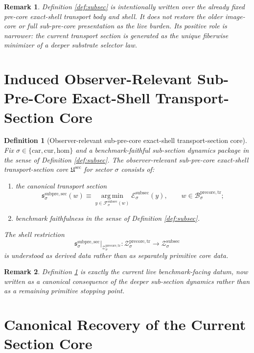 \documentclass[11pt]{article}
\newcommand{\Car}{\mathrm{car}}
\newcommand{\Cur}{\mathrm{cur}}
\newcommand{\Hom}{\mathrm{hom}}
\newcommand{\PreCoreTrBody}[1]{\mathcal B_{#1}^{\mathrm{precore,tr}}}
\newcommand{\PreCoreTrShell}[1]{\mathcal Z_{#1}^{\mathrm{precore,tr}}}
\newcommand{\SubPreSectionCore}{\mathfrak U^{\mathrm{sec}}}
\newcommand{\SubPreSection}[1]{\mathfrak s_{#1}^{\mathrm{subpre,sec}}}
\newcommand{\SubSectionFunctional}[1]{\mathscr E_{#1}^{\mathrm{subsec}}}
\newcommand{\SubSectionFiber}[2]{\mathcal F_{#1}^{\mathrm{subsec}}(#2)}
\newcommand{\SubSectionShell}[1]{\mathcal Z_{#1}^{\mathrm{subsec}}}
\newtheorem{definition}{Definition}
\newtheorem{remark}{Remark}
\begin{document}
\begin{remark}
Definition \ref{def:subsec} is intentionally written over the already fixed pre-core exact-shell transport body and shell. It does not restore the older image-core or full sub-pre-core presentation as the live burden. Its positive role is narrower: the current transport section is generated as the unique fiberwise minimizer of a deeper substrate selector law.
\end{remark}

\section{Induced Observer-Relevant Sub-Pre-Core Exact-Shell Transport-Section Core}

\begin{definition}[Observer-relevant sub-pre-core exact-shell transport-section core]
\label{def:sectioncore}
Fix \(\sigma\in\{\Car,\Cur,\Hom\}\) and a benchmark-faithful sub-section dynamics package in the sense of Definition \ref{def:subsec}. The \emph{observer-relevant sub-pre-core exact-shell transport-section core} \(\SubPreSectionCore\) for sector \(\sigma\) consists of:
\begin{enumerate}
    \item the canonical transport section
    \[
    \SubPreSection{\sigma}(w)
    \equiv
    \operatorname*{arg\,min}_{y\in\SubSectionFiber{\sigma}{w}}
    \SubSectionFunctional{\sigma}(y),
    \qquad
    w\in\PreCoreTrBody{\sigma};
    \]
    \item benchmark faithfulness in the sense of Definition \ref{def:subsec}.
\end{enumerate}
The shell restriction
\[
\SubPreSection{\sigma}\big|_{\PreCoreTrShell{\sigma}}
:
\PreCoreTrShell{\sigma}\to\SubSectionShell{\sigma}
\]
is understood as derived data rather than as separately primitive core data.
\end{definition}

\begin{remark}
Definition \ref{def:sectioncore} is exactly the current live benchmark-facing datum, now written as a canonical consequence of the deeper sub-section dynamics rather than as a remaining primitive stopping point.
\end{remark}

\section{Canonical Recovery of the Current Section Core}
\end{document}

